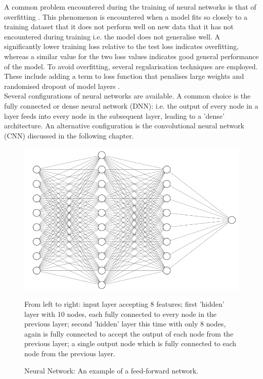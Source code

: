 \noindent
A common problem encountered during the training of neural networks is that of overfitting \cite{hawkins2004problem}. This phenomenon is encountered when a model fits so closely to a training dataset that it does not perform well on new data that it has not encountered during training i.e. the model does not generalise well. A significantly lower training loss relative to the test loss indicates overfitting, whereas a similar value for the two loss values indicates good general performance of the model. To avoid overfitting, several regularisation techniques are employed. These include adding a term to loss function that penalises large weights and randomised dropout of model layers \cite{srivastava2014dropout}. 
\\

\noindent
Several configurations of neural networks are available. A common choice is the fully connected or dense neural network (DNN): i.e. the output of every node in a layer feeds into every node in the subsequent layer, leading to a 'dense' architecture. An alternative configuration is the convolutional neural network (CNN) discussed in the following chapter. 

\begin{figure}[p]
	\centering
	\includegraphics[scale=0.6]{Figures/nn.png}
	\caption{Neural Network: An example of a feed-forward network.} {From left to right: input layer accepting 8 features; first 'hidden' layer with 10 nodes, each fully connected to every node in the previous layer; second 'hidden' layer this time with only 8 nodes, again is fully connected to accept the output of each node from the previous layer; a single output node which is fully connected to each node from the previous layer.}
	\label{fig:neural_network}
\end{figure}

